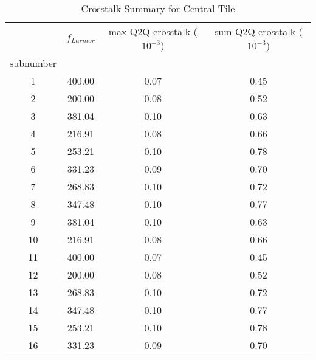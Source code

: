 \begin{table}
\caption{Crosstalk Summary for Central Tile}
\label{tab:crosstalk_summary_central_tile}
\begin{tabular}{|c|c|c|c|}
\toprule
 & $f_{Larmor}$ & max Q2Q crosstalk ($10^{-3}$) & sum Q2Q crosstalk ($10^{-3}$) \\
subnumber &  &  &  \\
\midrule
1 & 400.00 & 0.07 & 0.45 \\
2 & 200.00 & 0.08 & 0.52 \\
3 & 381.04 & 0.10 & 0.63 \\
4 & 216.91 & 0.08 & 0.66 \\
5 & 253.21 & 0.10 & 0.78 \\
6 & 331.23 & 0.09 & 0.70 \\
7 & 268.83 & 0.10 & 0.72 \\
8 & 347.48 & 0.10 & 0.77 \\
9 & 381.04 & 0.10 & 0.63 \\
10 & 216.91 & 0.08 & 0.66 \\
11 & 400.00 & 0.07 & 0.45 \\
12 & 200.00 & 0.08 & 0.52 \\
13 & 268.83 & 0.10 & 0.72 \\
14 & 347.48 & 0.10 & 0.77 \\
15 & 253.21 & 0.10 & 0.78 \\
16 & 331.23 & 0.09 & 0.70 \\
\bottomrule
\end{tabular}
\end{table}
